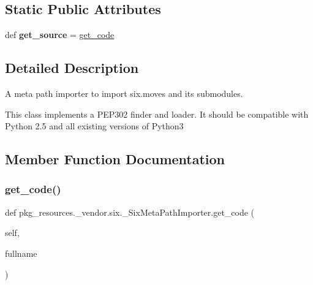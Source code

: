 \subsection*{Static Public Attributes}
\begin{DoxyCompactItemize}
\item 
\mbox{\label{classpkg__resources_1_1__vendor_1_1six_1_1___six_meta_path_importer_a0f9916c976712bb8246763ef1b658082}} 
def {\bfseries get\+\_\+source} = \hyperlink{classpkg__resources_1_1__vendor_1_1six_1_1___six_meta_path_importer_ade2b7f51d57f3b7ee68c99860908a660}{get\+\_\+code}
\end{DoxyCompactItemize}


\subsection{Detailed Description}
\begin{DoxyVerb}A meta path importer to import six.moves and its submodules.

This class implements a PEP302 finder and loader. It should be compatible
with Python 2.5 and all existing versions of Python3
\end{DoxyVerb}
 

\subsection{Member Function Documentation}
\mbox{\label{classpkg__resources_1_1__vendor_1_1six_1_1___six_meta_path_importer_ade2b7f51d57f3b7ee68c99860908a660}} 
\subsubsection{\texorpdfstring{get\+\_\+code()}{get\_code()}}
{\footnotesize\ttfamily def pkg\+\_\+resources.\+\_\+vendor.\+six.\+\_\+\+Six\+Meta\+Path\+Importer.\+get\+\_\+code (\begin{DoxyParamCaption}\item[{}]{self,  }\item[{}]{fullname }\end{DoxyParamCaption})}

